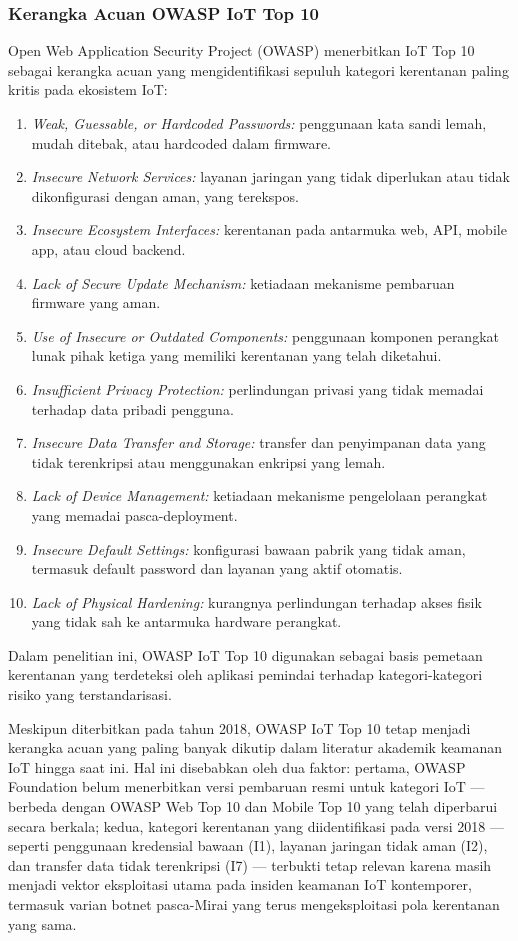 \subsubsection{Kerangka Acuan OWASP IoT Top 10}
Open Web Application Security Project (OWASP) menerbitkan IoT Top 10~\cite{b9}
sebagai kerangka acuan yang mengidentifikasi sepuluh kategori kerentanan paling
kritis pada ekosistem IoT:
\begin{enumerate}
    \item \textit{Weak, Guessable, or Hardcoded Passwords:} penggunaan kata
    sandi lemah, mudah ditebak, atau hardcoded dalam firmware.
    \item \textit{Insecure Network Services:} layanan jaringan yang tidak
    diperlukan atau tidak dikonfigurasi dengan aman, yang terekspos.
    \item \textit{Insecure Ecosystem Interfaces:} kerentanan pada antarmuka
    web, API, mobile app, atau cloud backend.
    \item \textit{Lack of Secure Update Mechanism:} ketiadaan mekanisme
    pembaruan firmware yang aman.
    \item \textit{Use of Insecure or Outdated Components:} penggunaan komponen
    perangkat lunak pihak ketiga yang memiliki kerentanan yang telah diketahui.
    \item \textit{Insufficient Privacy Protection:} perlindungan privasi yang
    tidak memadai terhadap data pribadi pengguna.
    \item \textit{Insecure Data Transfer and Storage:} transfer dan penyimpanan
    data yang tidak terenkripsi atau menggunakan enkripsi yang lemah.
    \item \textit{Lack of Device Management:} ketiadaan mekanisme pengelolaan
    perangkat yang memadai pasca-deployment.
    \item \textit{Insecure Default Settings:} konfigurasi bawaan pabrik yang
    tidak aman, termasuk default password dan layanan yang aktif otomatis.
    \item \textit{Lack of Physical Hardening:} kurangnya perlindungan terhadap
    akses fisik yang tidak sah ke antarmuka hardware perangkat.
\end{enumerate}
Dalam penelitian ini, OWASP IoT Top 10 digunakan sebagai basis pemetaan
kerentanan yang terdeteksi oleh aplikasi pemindai terhadap kategori-kategori
risiko yang terstandarisasi.

Meskipun diterbitkan pada tahun 2018, OWASP IoT Top 10 tetap menjadi kerangka
acuan yang paling banyak dikutip dalam literatur akademik keamanan IoT hingga
saat ini. Hal ini disebabkan oleh dua faktor: pertama, OWASP Foundation belum
menerbitkan versi pembaruan resmi untuk kategori IoT --- berbeda dengan OWASP
Web Top 10 dan Mobile Top 10 yang telah diperbarui secara berkala; kedua,
kategori kerentanan yang diidentifikasi pada versi 2018 --- seperti penggunaan
kredensial bawaan (I1), layanan jaringan tidak aman (I2), dan transfer data
tidak terenkripsi (I7) --- terbukti tetap relevan karena masih menjadi vektor
eksploitasi utama pada insiden keamanan IoT kontemporer, termasuk varian botnet
pasca-Mirai yang terus mengeksploitasi pola kerentanan yang sama.

